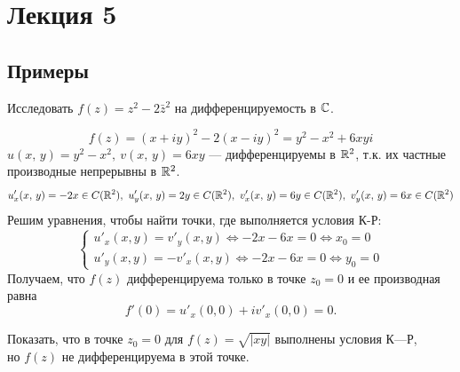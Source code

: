 	\section{Лекция 5}
	\subsection{Примеры}
	\begin{example}
		Исследовать $f(z) = z^2-2\bar z^2$ на дифференцируемость в $\mathbb{C}$.
	\end{example}
		\[ f(z) = (x + iy)^2 - 2(x - iy)^2 = y^2 - x^2 + 6xyi \]
		$ u(x,\, y) = y^2 - x^2,\ v(x,\, y) = 6xy $ --- дифференцируемы в $ \mathbb{R}^2 $, т.к. их частные производные непрерывны в $ \mathbb{R}^2 $.
		\begin{align*}
			u'_x(x,\,y) = -2x \in C(\mathbb{R}^2),\ u'_y(x,\,y) = 2y\in C(\mathbb{R}^2),\
			v'_x(x,\,y) = 6y\in C(\mathbb{R}^2),\ v'_y(x,\,y) = 6x\in C(\mathbb{R}^2)
		\end{align*}
		Решим уравнения, чтобы найти точки, где выполняется условия К-Р:
		\[
		\begin{cases}
			u'_x(x, y) = v'_y(x, y) \iff -2x - 6x = 0 \iff x_0 = 0 \\
			u'_y(x, y) = -v'_x(x, y) \iff -2x - 6x = 0 \iff y_0 = 0
		\end{cases}
		\]
		Получаем, что $f(z)$ дифференцируема только в точке $z_0 = 0$ и ее производная равна
		\[f'(0) = u'_x(0, 0) + iv'_x(0, 0) = 0. \]
	\begin{example}
		Показать, что в точке $z_0 = 0$ для $f(z) = \sqrt{|xy|}$ выполнены условия К---Р,\\ но $f(z)$ не дифференцируема в этой точке.
	\end{example}
